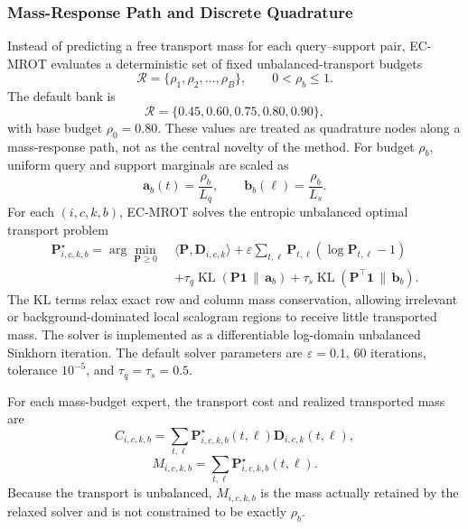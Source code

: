 \documentclass[journal]{IEEEtran}
\newcommand{\method}{EC-MROT}
\newcommand{\Rbank}{\mathcal{R}}
\newcommand{\1}{\mathbf{1}}
\begin{document}
\subsubsection{Mass-Response Path and Discrete Quadrature}
Instead of predicting a free transport mass for each query--support pair, \method{} evaluates a deterministic set of fixed unbalanced-transport budgets
\begin{equation}
    \Rbank=\{\rho_1,\rho_2,\ldots,\rho_B\}, \qquad 0<\rho_b\le 1 .
\end{equation}
The default bank is
\begin{equation}
    \Rbank=\{0.45,0.60,0.75,0.80,0.90\},
\end{equation}
with base budget $\rho_0=0.80$. These values are treated as quadrature nodes along a mass-response path, not as the central novelty of the method. For budget $\rho_b$, uniform query and support marginals are scaled as
\begin{equation}
    \mathbf{a}_b(t)=\frac{\rho_b}{L_q},
    \qquad
    \mathbf{b}_b(\ell)=\frac{\rho_b}{L_s}.
    \label{eq:ecot_marginals}
\end{equation}
For each $(i,c,k,b)$, \method{} solves the entropic unbalanced optimal transport problem
\begin{equation}
\begin{aligned}
    \mathbf{P}_{i,c,k,b}^{\star}
    =
    \arg\min_{\mathbf{P}\ge 0}\;
    &\langle \mathbf{P},\mathbf{D}_{i,c,k}\rangle
    + \varepsilon \sum_{t,\ell}
        \mathbf{P}_{t,\ell}
        \left(\log \mathbf{P}_{t,\ell}-1\right) \\
    &+ \tau_q
        \operatorname{KL}(\mathbf{P}\mathbf{1}\,\|\,\mathbf{a}_b)
    + \tau_s
        \operatorname{KL}(\mathbf{P}^{\top}\mathbf{1}\,\|\,\mathbf{b}_b).
\end{aligned}
\label{eq:ecot_uot}
\end{equation}
The KL terms relax exact row and column mass conservation, allowing irrelevant or background-dominated local scalogram regions to receive little transported mass. The solver is implemented as a differentiable log-domain unbalanced Sinkhorn iteration. The default solver parameters are $\varepsilon=0.1$, $60$ iterations, tolerance $10^{-5}$, and $\tau_q=\tau_s=0.5$.

For each mass-budget expert, the transport cost and realized transported mass are
\begin{equation}
    C_{i,c,k,b}
    =
    \sum_{t,\ell}
    \mathbf{P}_{i,c,k,b}^{\star}(t,\ell)
    \mathbf{D}_{i,c,k}(t,\ell),
\end{equation}
\begin{equation}
    M_{i,c,k,b}
    =
    \sum_{t,\ell}
    \mathbf{P}_{i,c,k,b}^{\star}(t,\ell).
\end{equation}
Because the transport is unbalanced, $M_{i,c,k,b}$ is the mass actually retained by the relaxed solver and is not constrained to be exactly $\rho_b$.
\end{document}
